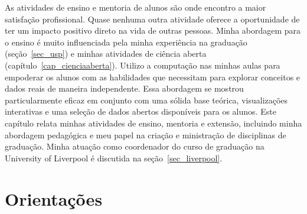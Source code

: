 \documentclass[10pt,a4paper,oneside]{book}
\begin{document}
As atividades de ensino e mentoria de alunos são onde encontro a maior
satisfação profissional.
Quase nenhuma outra atividade oferece a oportunidade de ter um impacto positivo
direto na vida de outras pessoas.
Minha abordagem para o ensino é muito influenciada pela minha experiência na
graduação (seção~\ref{sec_usp}) e minhas atividades de ciência aberta
(capítulo~\ref{cap_cienciaaberta}).
Utilizo a computação nas minhas aulas para empoderar os alunos com as
habilidades que necessitam para explorar conceitos e dados reais de maneira
independente.
Essa abordagem se mostrou particularmente eficaz em conjunto com uma sólida
base teórica, visualizações interativas e uma seleção de dados abertos
disponíveis para os alunos.
Este capítulo relata minhas atividades de ensino, mentoria e extensão,
incluindo minha abordagem pedagógica e meu papel na criação e ministração de
disciplinas de graduação.
Minha atuação como coordenador do curso de graduação na University of Liverpool
é discutida na seção~\ref{sec_liverpool}.

\section{Orientações}
\label{sec_orientacao}
\end{document}

